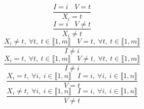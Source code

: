 $$\frac{I=i~~~~V=t}{X_{i}=t}$$ $$\frac{I=i~~~~V \neq t}{X_{i} \neq t}$$ $$\frac{X_{i} \neq t,~\forall t,~t \in \llbracket1,m\rrbracket~~~~V=t,~\forall t,~t \in \llbracket1,m\rrbracket}{I \neq i}$$ $$\frac{X_{i}=t,~\forall t,~t \in \llbracket1,m\rrbracket~~~~V \neq t,~\forall t,~t \in \llbracket1,m\rrbracket}{I \neq i}$$ $$\frac{X_{i}=t,~\forall i,~i \in \llbracket1,n\rrbracket~~~~I=i,~\forall i,~i \in \llbracket1,n\rrbracket}{V=t}$$ $$\frac{X_{i} \neq t,~\forall i,~i \in \llbracket1,n\rrbracket~~~~I=i,~\forall i,~i \in \llbracket1,n\rrbracket}{V \neq t}$$ 